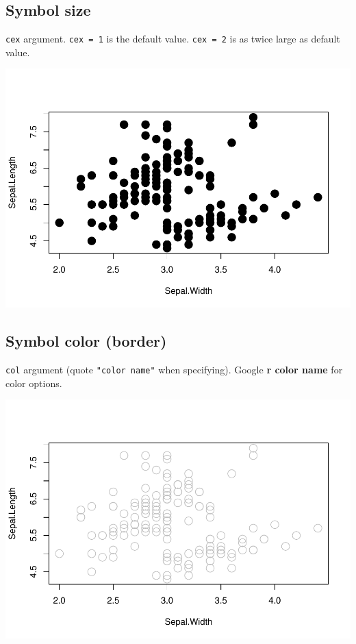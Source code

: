 \documentclass[
]{book}
\begin{document}
\hypertarget{symbol-size}{%
\subsection{Symbol size}\label{symbol-size}}

\texttt{cex} argument. \texttt{cex\ =\ 1} is the default value. \texttt{cex\ =\ 2} is as twice large as default value.

\includegraphics{_main_files/figure-latex/unnamed-chunk-25-1.pdf}

\hypertarget{symbol-color-border}{%
\subsection{Symbol color (border)}\label{symbol-color-border}}

\texttt{col} argument (quote \texttt{"color\ name"} when specifying). Google \textbf{r color name} for color options.

\includegraphics{_main_files/figure-latex/unnamed-chunk-26-1.pdf}
\end{document}
